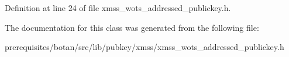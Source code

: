 Definition at line 24 of file xmss\+\_\+wots\+\_\+addressed\+\_\+publickey.\+h.



The documentation for this class was generated from the following file\+:\begin{DoxyCompactItemize}
\item 
prerequisites/botan/src/lib/pubkey/xmss/xmss\+\_\+wots\+\_\+addressed\+\_\+publickey.\+h\end{DoxyCompactItemize}

